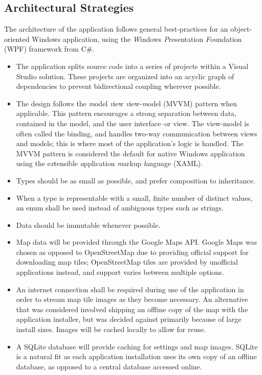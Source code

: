 \documentclass[12pt, letterpaper]{article}
\begin{document}
\subsection{Architectural Strategies}
The architecture of the application follows general best-practices for an object-oriented Windows application,
  using the \emph{W}indows \emph{P}resentation \emph{F}oundation (WPF) framework from C\#.
\begin{itemize}
  \item The application splits source code into a series of projects within a Visual Studio solution.
    These projects are organized into an acyclic graph of dependencies to prevent bidirectional coupling wherever possible.
  \item The design follows the \emph{m}odel \emph{v}iew \emph{v}iew-\emph{m}odel (MVVM) pattern when applicable.
    This pattern encourages a strong separation between data, contained in the model, and the user interface--or view.
    The view-model is often called the binding, and handles two-way communication between views and models;
    this is where most of the application's logic is handled.
    The MVVM pattern is considered the default for native Windows application using the e\emph{x}tensible \emph{a}pplication \emph{m}arkup \emph{l}anguage (XAML)\cite{msdn_mvvm}.
  \item Types should be as small as possible, and prefer composition to inheritance.
  \item When a type is representable with a small, finite number of distinct values, an enum shall be used instead of ambiguous types such as strings.
  \item Data should be immutable whenever possible.
  \item Map data will be provided through the Google Maps API.
    Google Maps was chosen as opposed to OpenStreetMap due to providing official support for downloading map tiles\cite{gmaps_tiles};
    OpenStreetMap tiles are provided by unofficial applications instead, and support varies between multiple options\cite{osm_tiles}.
  \item An internet connection shall be required during use of the application in order to stream map tile images as they become necessary.
    An alternative that was considered involved shipping an offline copy of the map with the application installer,
    but was decided against primarily because of large install sizes.
    Images will be cached locally to allow for reuse.
  \item A SQLite database will provide caching for settings and map images.
    SQLite is a natural fit as each application installation uses its own copy of an offline database, as opposed to a central database accessed online.
\end{itemize}
\end{document}
